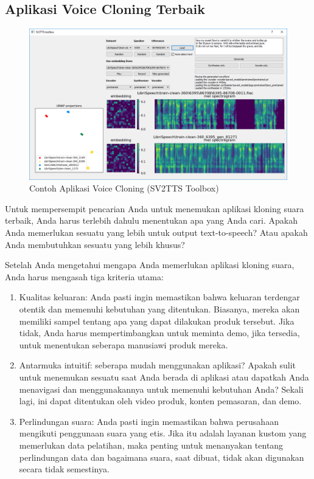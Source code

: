 \subsection{Aplikasi Voice Cloning Terbaik}

\begin{figure}[H]
        \centerline{\includegraphics[scale=.35]{figures/voice-clone}}
        \caption{Contoh Aplikasi Voice Cloning (SV2TTS Toolbox)}
		\label{appvoice}
\end{figure}

Untuk mempersempit pencarian Anda untuk menemukan aplikasi kloning suara terbaik, Anda harus terlebih dahulu menentukan apa yang Anda cari. Apakah Anda memerlukan sesuatu yang lebih untuk output text-to-speech? Atau apakah Anda membutuhkan sesuatu yang lebih khusus?

Setelah Anda mengetahui mengapa Anda memerlukan aplikasi kloning suara, Anda harus mengasah tiga kriteria utama:
\begin{enumerate}
\item Kualitas keluaran: Anda pasti ingin memastikan bahwa keluaran terdengar otentik dan memenuhi kebutuhan yang ditentukan. Biasanya, mereka akan memiliki sampel tentang apa yang dapat dilakukan produk tersebut. Jika tidak, Anda harus mempertimbangkan untuk meminta demo, jika tersedia, untuk menentukan seberapa manusiawi produk mereka.

\item Antarmuka intuitif: seberapa mudah menggunakan aplikasi? Apakah sulit untuk menemukan sesuatu saat Anda berada di aplikasi atau dapatkah Anda menavigasi dan menggunakannya untuk memenuhi kebutuhan Anda? Sekali lagi, ini dapat ditentukan oleh video produk, konten pemasaran, dan demo.

\item Perlindungan suara: Anda pasti ingin memastikan bahwa perusahaan mengikuti penggunaan suara yang etis. Jika itu adalah layanan kustom yang memerlukan data pelatihan, maka penting untuk menanyakan tentang perlindungan data dan bagaimana suara, saat dibuat, tidak akan digunakan secara tidak semestinya.
\end{enumerate}

